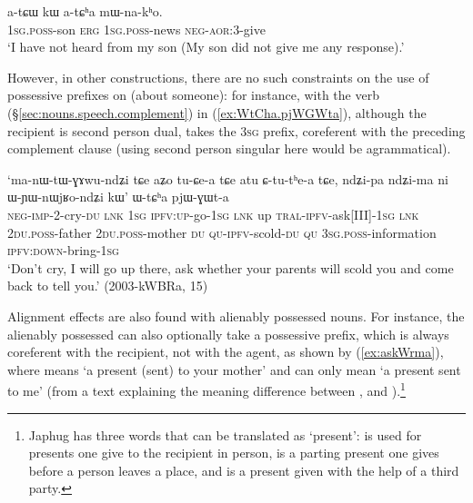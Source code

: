 \begin{exe}
\ex \label{ex:atCha.mWnakho}
\gll  a-tɕɯ kɯ a-tɕʰa mɯ-na-kʰo. \\
\textsc{1sg}.\textsc{poss}-son \textsc{erg} \textsc{1sg}.\textsc{poss}-news \textsc{neg}-\textsc{aor}:3\flobv{}-give \\
\glt `I have not heard from my son (My son did not give me any response).' 
\end{exe}

However, in other constructions, there are no such constraints on the use of possessive prefixes on (about someone): for instance, with the verb  (§\ref{sec:nouns.speech.complement}) in (\ref{ex:WtCha.pjWGWta}), although the recipient is second person dual,  takes the \textsc{3sg} prefix, coreferent with the preceding complement clause (using second person singular  here would be agrammatical).

\begin{exe}
\ex \label{ex:WtCha.pjWGWta}
\gll `ma-nɯ-tɯ-ɣɤwu-ndʑi tɕe aʑo tu-ɕe-a tɕe atu ɕ-tu-tʰe-a tɕe,
ndʑi-pa ndʑi-ma ni ɯ-ɲɯ-nɯjʁo-ndʑi kɯ' ɯ-tɕʰa pjɯ-ɣɯt-a \\
\textsc{neg}-\textsc{imp}-2-cry-\textsc{du} \textsc{lnk} \textsc{1sg} \textsc{ipfv}:\textsc{up}-go-\textsc{1sg} \textsc{lnk} up \textsc{tral}-\textsc{ipfv}-ask[III]-\textsc{1sg} \textsc{lnk} \textsc{2du}.\textsc{poss}-father \textsc{2du}.\textsc{poss}-mother \textsc{du} \textsc{qu}-\textsc{ipfv}-scold-\textsc{du} \textsc{qu} \textsc{3sg}.\textsc{poss}-information \textsc{ipfv}:\textsc{down}-bring-\textsc{1sg} \\
\glt `Don't cry, I will go up there, ask whether your parents will scold you and come back to tell you.' (2003-kWBRa, 15)
\end{exe}

Alignment effects are also found with alienably possessed nouns. For instance, the alienably possessed  can also optionally take a possessive prefix, which is always coreferent with the recipient, not with the agent, as shown by (\ref{ex:askWrma}), where  means `a present (sent) to your mother' and  can only mean `a present sent to me' (from a text explaining the meaning difference between ,  and ).\footnote{Japhug has three words that can be translated as `present':  is used for presents one give to the recipient in person,  is a parting present one gives before a person leaves a place, and  is a present given with the help of a third party.}

